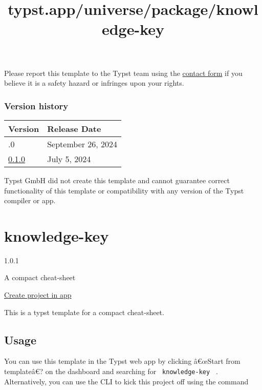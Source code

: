 Please report this template to the Typst team using the
\href{https://typst.app/contact}{contact form} if you believe it is a
safety hazard or infringes upon your rights.

\label{versions}
\subsubsection{Version history}\label{version-history}

\begin{longtable}[]{@{}ll@{}}
\toprule\noalign{}
Version & Release Date \\
\midrule\noalign{}
\endhead
\bottomrule\noalign{}
\endlastfoot
0.2.0 & September 26, 2024 \\
\href{https://typst.app/universe/package/georges-yetyp/0.1.0/}{0.1.0} &
July 5, 2024 \\
\end{longtable}

Typst GmbH did not create this template and cannot guarantee correct
functionality of this template or compatibility with any version of the
Typst compiler or app.


\title{typst.app/universe/package/knowledge-key}

\label{banner}
\label{template-thumbnail}

\section{knowledge-key}\label{knowledge-key}

{ 1.0.1 }

A compact cheat-sheet

\href{/app?template=knowledge-key&version=1.0.1}{Create project in app}

\label{readme}
This is a typst template for a compact cheat-sheet.

\subsection{Usage}\label{usage}

You can use this template in the Typst web app by clicking â€œStart from
templateâ€? on the dashboard and searching for
\texttt{\ knowledge-key\ } . Alternatively, you can use the CLI to kick
this project off using the command

